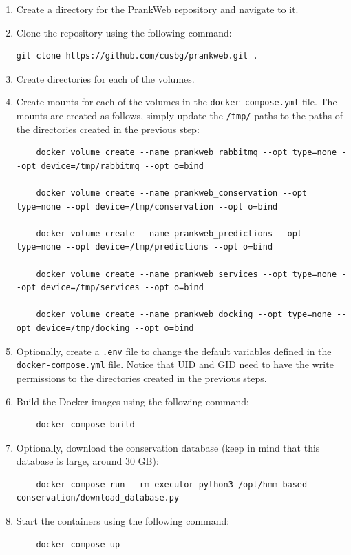 \begin{enumerate}
    \item Create a directory for the PrankWeb repository and navigate to it.
    \item Clone the repository using the following command:
    \begin{lstlisting}[language=clean]
    git clone https://github.com/cusbg/prankweb.git .
    \end{lstlisting}
    \item Create directories for each of the volumes.
    \item Create mounts for each of the volumes in the \texttt{docker-compose.yml} file. The mounts are created as follows, simply update the \texttt{/tmp/} paths to the paths of the directories created in the previous step:
    \begin{lstlisting}
    docker volume create --name prankweb_rabbitmq --opt type=none --opt device=/tmp/rabbitmq --opt o=bind

    docker volume create --name prankweb_conservation --opt type=none --opt device=/tmp/conservation --opt o=bind

    docker volume create --name prankweb_predictions --opt type=none --opt device=/tmp/predictions --opt o=bind

    docker volume create --name prankweb_services --opt type=none --opt device=/tmp/services --opt o=bind

    docker volume create --name prankweb_docking --opt type=none --opt device=/tmp/docking --opt o=bind
    \end{lstlisting}
    \item Optionally, create a \texttt{.env} file to change the default variables defined in the \texttt{docker-compose.yml} file. Notice that UID and GID need to have the write permissions to the directories created in the previous steps.
    \item Build the Docker images using the following command:
    \begin{lstlisting}
    docker-compose build
    \end{lstlisting}
    \item Optionally, download the conservation database (keep in mind that this database is large, around 30 GB):
    \begin{lstlisting}
    docker-compose run --rm executor python3 /opt/hmm-based-conservation/download_database.py
    \end{lstlisting}
    \item Start the containers using the following command:
    \begin{lstlisting}
    docker-compose up
    \end{lstlisting}
\end{enumerate}

